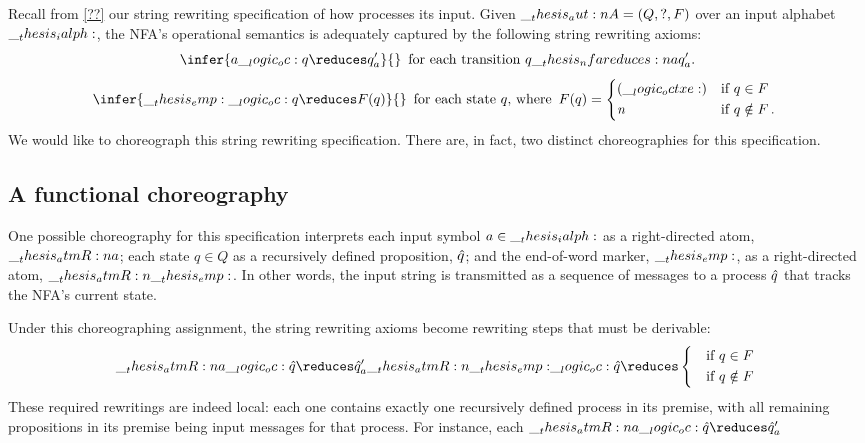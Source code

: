 Recall from \cref{??} our string rewriting specification of how  processes its input.
Given  $\__thesis_aut:n {A} = (Q, ?, F)$ over an input alphabet $\__thesis_ialph:$, the \ac{NFA}'s operational semantics is adequately captured by the following string rewriting axioms:
\begin{equation*}
  \infer{a \oc q \reduces q'_a}{}
  \enspace\text{for each transition $q \nfareduces[a] q'_a$.}
\end{equation*}
\begin{equation*}
  \infer{\emp \oc q \reduces F(q)}{}
  \enspace\text{for each state $q$, where}\enspace
  F(q) = \begin{cases*}
           (\octxe) & if $q \in F$ \\
           \symrej & if $q \notin F$\,.
         \end{cases*}
\end{equation*}
We would like to choreograph this string rewriting specification.
There are, in fact, two distinct choreographies for this specification.

\subsection{A functional choreography}

One possible choreography for this specification interprets each input symbol $a \in \__thesis_ialph:$ as a right-directed atom, $\__thesis_atmR:n {a}$; each state $q \in Q$ as a recursively defined proposition, $\hat{q}$; and the end-of-word marker, $\__thesis_emp:$, as a right-directed atom, $\__thesis_atmR:n {\__thesis_emp:}$.
In other words, the input string is transmitted as a sequence of messages to a process $\hat{q}$ that tracks the \ac{NFA}'s current state.


Under this choreographing assignment, the string rewriting axioms become rewriting steps that must be derivable:
\begin{equation*}
  \atmR{a} \oc \defp{q}
    \reduces \defp{q}'_a
  \atmR{\emp} \oc \defp{q}
    \reduces \begin{cases*}
               & if $q \in F$ \\
               & if $q \notin F$
             \end{cases*}
\end{equation*}
These required rewritings are indeed local: each one contains exactly one recursively defined process in its premise, with all remaining propositions in its premise being input messages for that process.
For instance, each $\atmR{a} \oc \defp{q} \reduces \defp{q}'_a$

